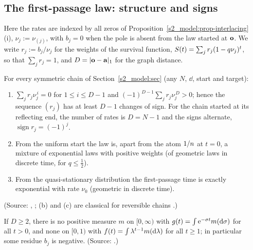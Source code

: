 \subsection{The first-passage law: structure and signs}\label{s6b_rigorous:ssec-structure}

Here the rates are indexed by all zeros of Proposition~\ref{s2_model:prop-interlacing}(i), $\nu_j:=\nu_{(j)}$, with
$b_j=0$ when the pole is absent from the law started at $\mathbf{o}$. We write $r_j:=b_j/\nu_j$ for the weights of the survival
function, $S(t)=\sum_jr_j(1-q\nu_j)^{t}$, so that $\sum_jr_j=1$, and $D=|\mathbf{o}-\mathbf{a}|_1$ for the graph distance.

\begin{theorem}\label{s6b_rigorous:thm-signs}
For every symmetric chain of Section~\ref{s2_model:sec} (any $N$, $\dd$, start and target):
\begin{enumerate}
\item[(a)] $\sum_jr_j\nu_j^{\,i}=0$ for $1\le i\le D-1$ and $(-1)^{D-1}\sum_jr_j\nu_j^{\,D}>0$; hence the sequence
$(r_j)$ has at least $D-1$ changes of sign. For the chain started at its reflecting end, the number of rates is
$D=N-1$ and the signs alternate, $\operatorname{sign}r_j=(-1)^j$.
\item[(b)] From the uniform start the law is, apart from the atom $1/n$ at $t=0$, a mixture of exponential laws
with positive weights (of geometric laws in discrete time, for $q\le\frac12$).
\item[(c)] From the quasi-stationary distribution the first-passage time is exactly exponential with rate $\nu_0$
(geometric in discrete time).
\end{enumerate}
\textup{(Source: , ; (b) and (c) are classical for reversible
chains \citep{AldousFill}.)}
\end{theorem}

\begin{theorem}\label{s6b_rigorous:thm-notmixture}
If $D\ge2$, there is no positive measure $m$ on $[0,\infty)$ with $g(t)=\int\mathrm{e}^{-\sigma t}m(\mathrm{d}\sigma)$ for all
$t>0$, and none on $[0,1)$ with $f(t)=\int\lambda^{t-1}m(\mathrm{d}\lambda)$ for all $t\ge1$; in particular some residue
$b_j$ is negative.
\textup{(Source: .)}
\end{theorem}

